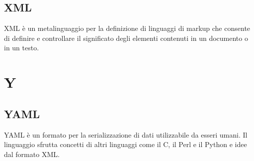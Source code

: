 \subsection{XML}  XML è un metalinguaggio per la definizione di linguaggi di markup che consente di definire e controllare il significato degli elementi contenuti in un documento o in un testo.

\newpage \section{Y}
\subsection{YAML}  YAML è un formato per la serializzazione di dati utilizzabile da esseri umani. Il linguaggio sfrutta concetti di altri linguaggi come il C, il Perl e il Python e idee dal formato XML.